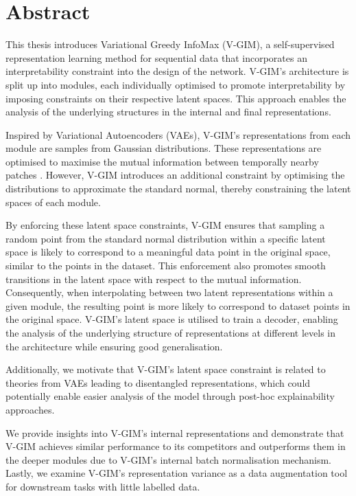 \chapter*{ Abstract}

This thesis introduces Variational Greedy InfoMax (V-GIM), a self-supervised representation learning method for sequential data that incorporates an interpretability constraint into the design of the network. V-GIM's architecture is split up into modules, each individually optimised to promote interpretability by imposing constraints on their respective latent spaces. This approach enables the analysis of the underlying structures in the internal and final representations.

Inspired by Variational Autoencoders (VAEs), V-GIM's representations from each module are samples from Gaussian distributions. These representations are optimised to maximise the mutual information between temporally nearby patches \citep{lowePuttingEndEndtoEnd2020a}. However, V-GIM introduces an additional constraint by optimising the distributions to approximate the standard normal, thereby constraining the latent spaces of each module.


By enforcing these latent space constraints, V-GIM ensures that sampling a random point from the standard normal distribution within a specific latent space is likely to correspond to a meaningful data point in the original space, similar to the points in the dataset. This enforcement also promotes smooth transitions in the latent space with respect to the mutual information. Consequently, when interpolating between two latent representations within a given module, the resulting point is more likely to correspond to dataset points in the original space. V-GIM's latent space is utilised to train a decoder, enabling the analysis of the underlying structure of representations at different levels in the architecture while ensuring good generalisation.

Additionally, we motivate that V-GIM's latent space constraint is related to theories from VAEs leading to disentangled representations, which could potentially enable easier analysis of the model through post-hoc explainability approaches. 

We provide insights into V-GIM's internal representations and demonstrate that V-GIM achieves similar performance to its competitors and outperforms them in the deeper modules due to V-GIM's internal batch normalisation mechanism. Lastly, we examine V-GIM's representation variance as a data augmentation tool for downstream tasks with little labelled data.




